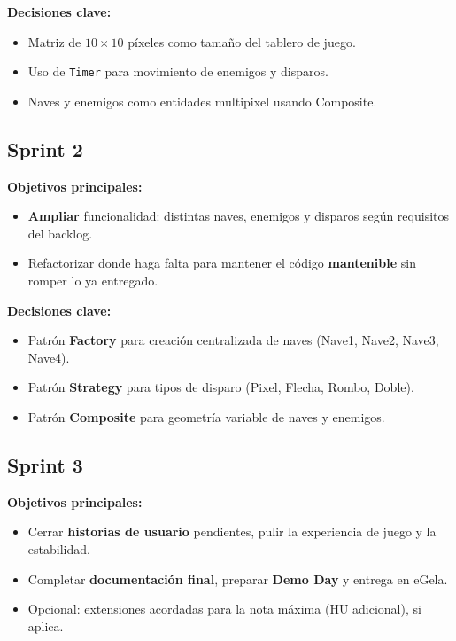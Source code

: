 \documentclass[12pt, a4paper]{article}
\begin{document}
\textbf{Decisiones clave:}
\begin{itemize}[leftmargin=2em]
    \item Matriz de $10 \times 10$ píxeles como tamaño del tablero de juego.
    \item Uso de \texttt{Timer} para movimiento de enemigos y disparos.
    \item Naves y enemigos como entidades multipixel usando Composite.
\end{itemize}

\subsection{Sprint 2}

\textbf{Objetivos principales:}
\begin{itemize}[leftmargin=2em]
    \item \textbf{Ampliar} funcionalidad: distintas naves, enemigos y disparos según requisitos del backlog.
    \item Refactorizar donde haga falta para mantener el código \textbf{mantenible} sin romper lo ya entregado.
\end{itemize}

\textbf{Decisiones clave:}
\begin{itemize}[leftmargin=2em]
    \item Patrón \textbf{Factory} para creación centralizada de naves (Nave1, Nave2, Nave3, Nave4).
    \item Patrón \textbf{Strategy} para tipos de disparo (Pixel, Flecha, Rombo, Doble).
    \item Patrón \textbf{Composite} para geometría variable de naves y enemigos.
\end{itemize}

\subsection{Sprint 3}

\textbf{Objetivos principales:}
\begin{itemize}[leftmargin=2em]
    \item Cerrar \textbf{historias de usuario} pendientes, pulir la experiencia de juego y la estabilidad.
    \item Completar \textbf{documentación final}, preparar \textbf{Demo Day} y entrega en eGela.
    \item Opcional: extensiones acordadas para la nota máxima (HU adicional), si aplica.
\end{itemize}
\end{document}

